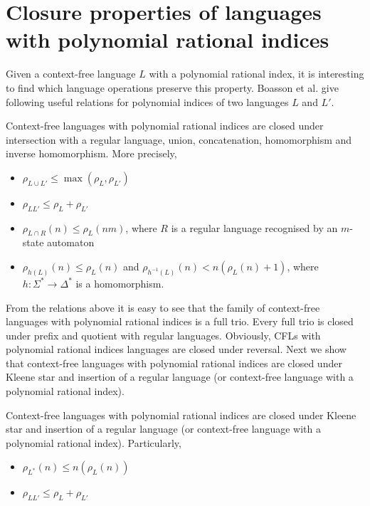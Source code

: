 \section{Closure properties of languages with polynomial rational indices}
\label{sec:closure}
Given a context-free language $L$ with a polynomial rational index, it is interesting to find which language operations preserve this property.  Boasson et al. \cite{RatBasic} give following useful relations for polynomial indices of two languages $L$ and $L'$.
\begin{theorem}
Context-free languages with polynomial rational indices are closed under intersection with a regular language, union, concatenation, homomorphism and inverse homomorphism. More precisely,
\begin{itemize}
\item $\rho_{L \cup L'} \le  \max{(\rho_L, \rho_{L'})} $
\item $\rho_{LL'} \le \rho_L + \rho_{L'}$
\item $\rho_{L \cap R}(n) \le \rho_L(nm)$, where $R$ is a regular language recognised by an $m$-state automaton
\item $\rho_{h(L)}(n) \le \rho_L(n)$ and $\rho_{h^{-1}(L)}(n) < n(\rho_L(n) +1)$, where $h: \Sigma^* \rightarrow \Delta^*$ is a homomorphism.
\end{itemize}
\end{theorem}
From the relations above it is easy to see that the family of context-free languages with polynomial rational indices is a full trio. Every full trio is closed under prefix and quotient with regular languages. Obviously, CFLs with polynomial rational indices languages are closed under reversal.  Next we show that context-free languages with polynomial rational indices are closed under Kleene star and insertion of a regular language (or context-free language with a polynomial rational index).
\begin{theorem}
Context-free languages with polynomial rational indices are closed under Kleene star and insertion of a regular language  (or context-free language with a polynomial rational index). Particularly,
\begin{itemize}
\item $\rho_{L^*}(n) \le n(\rho_L(n))$
\item $\rho_{LL'} \le \rho_L + \rho_{L'}$
\end{itemize}
\end{theorem}
